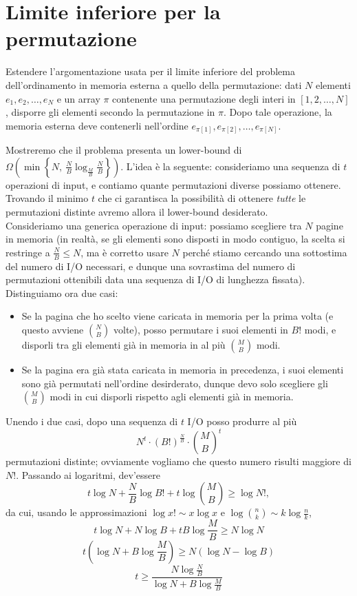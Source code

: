 \chapter{Limite inferiore per la permutazione}

\begin{problem*}
    Estendere l'argomentazione usata per il limite inferiore del problema 
    dell'ordinamento in memoria esterna a quello della permutazione: dati
    \(N\) elementi \(e_1,e_2,\dots ,e_N\) e un array \(\pi\) contenente
    una permutazione degli interi in \([1,2,\dots ,N]\), disporre gli
    elementi secondo la permutazione in \(\pi\). Dopo tale operazione,
    la memoria esterna deve contenerli nell'ordine
    \(e_{\pi[1]},e_{\pi[2]},\dots ,e_{\pi[N]}\).
\end{problem*}

Mostreremo che il problema presenta un lower-bound di $\displaystyle\Omega\left(\min\left\{N,~\frac{N}{B}\log_{\frac{M}{B}}\frac{N}{B}\right\}\right)$.
L'idea è la seguente: consideriamo una sequenza di $t$ operazioni di input, e contiamo quante permutazioni diverse possiamo ottenere. Trovando il minimo $t$ che ci garantisca la possibilità di ottenere \textit{tutte} le permutazioni distinte avremo allora il lower-bound desiderato.\[\]
Consideriamo una generica operazione di input: possiamo scegliere tra $N$ pagine in memoria (in realtà, se gli elementi sono disposti in modo contiguo, la scelta si restringe a $\frac{N}{B}\le N$, ma è corretto usare $N$ perché stiamo cercando una sottostima del numero di I/O necessari, e dunque una sovrastima del numero di permutazioni ottenibili data una sequenza di I/O di lunghezza fissata). Distinguiamo ora due casi:
\begin{itemize}
\item Se la pagina che ho scelto viene caricata in memoria per la prima volta (e questo avviene $N \choose B$ volte), posso permutare i suoi elementi in $B!$ modi, e disporli tra gli elementi già in memoria in al più $M\choose{B}$ modi.
\item Se la pagina era già stata caricata in memoria in precedenza, i suoi elementi sono già permutati nell'ordine desirderato, dunque devo solo scegliere gli $M\choose B$ modi in cui disporli rispetto agli elementi già in memoria.
\end{itemize}
Unendo i due casi, dopo una sequenza di $t$ I/O posso produrre al più \[N^t\cdot(B!)^\frac{N}{B}\cdot {M\choose B}^t\] permutazioni distinte; ovviamente vogliamo che questo numero risulti maggiore di $N!$. Passando ai logaritmi, dev'essere \[t\log N + \frac{N}{B}\log B! + t\log {M\choose B} \ge \log N!,\]da cui, usando le approssimazioni $\log x! \sim x\log x$ e $\log{n\choose k} \sim k\log\frac{n}{k}$, \[t\log N + N\log B + tB\log\frac{M}{B} \ge N\log N\]\[t\left(\log N + B\log\frac{M}{B}\right)\ge N(\log N-\log B)\]\[t\ge\frac{N\log\frac{N}{B}}{\log N + B\log\frac{M}{B}}\]
